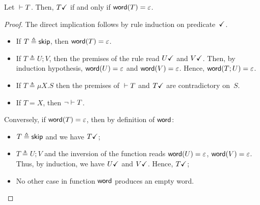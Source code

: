 \begin{lemma}
  \label{lemma:terminated-togrammar}
  Let $\isType[] T$. Then, $\DONE T$ if and only if
  $\word(T) = \varepsilon$.
\end{lemma}
%
\begin{proof}
  The direct implication follows by rule induction on
  predicate~$\DONE$.
  \begin{itemize}
  \item If $T \triangleq \skipk$, then $\word(T) = \varepsilon$.
  \item If $T\triangleq U;V$, then the premises of the rule read
    $\DONE{U}$ and $\DONE{V}$. Then, by induction hypothesis,
    $\word(U) = \varepsilon$ and $\word(V) = \varepsilon$. Hence,
    $\word(T;U) = \varepsilon$.
  \item If $T\triangleq \mu X.S$ then the premises of $\isType[]T$ and
    $\DONE T$ are contradictory on~$S$.
  \item If $T=X$, then $\neg \isType[]T$.
  \end{itemize}
  Conversely, if $\word(T) = \varepsilon$, then by definition of
  $\word$:
  \begin{itemize}
  \item $T\triangleq \skipk$ and we have $\DONE T$;
  \item $T\triangleq U;V$ and the inversion of the function reads
    $\word(U) = \varepsilon$, $\word(V) = \varepsilon$.  Thus, by
    induction, we have $\DONE U$ and $\DONE V$. Hence, $\DONE T$;
  \item No other case in function $\word$ produces an empty word.
  \end{itemize}
\end{proof}


